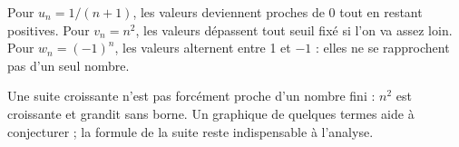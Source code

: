 \begin{exemple}
Pour $u_n=1/(n+1)$, les valeurs deviennent proches de 0 tout en restant positives.
Pour $v_n=n^2$, les valeurs dépassent tout seuil fixé si l'on va assez loin.
Pour $w_n=(-1)^n$, les valeurs alternent entre 1 et $-1$ : elles ne se
rapprochent pas d'un seul nombre.
\end{exemple}
\begin{center}\par
{}
\end{center}
\begin{attention}
Une suite croissante n'est pas forcément proche d'un nombre fini : $n^2$
est croissante et grandit sans borne. Un graphique de quelques termes aide
à conjecturer ; la formule de la suite reste indispensable à l'analyse.
\end{attention}
\exercices

